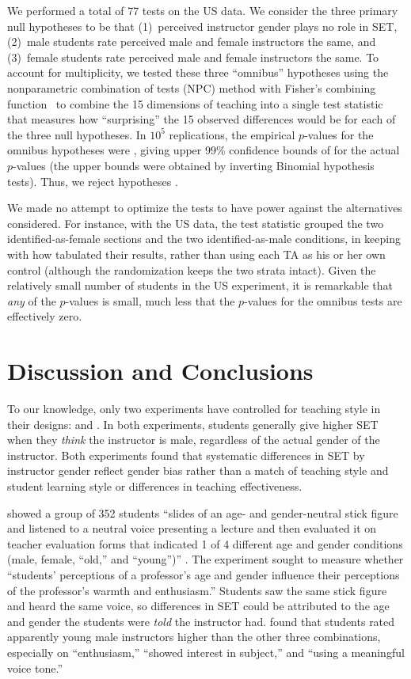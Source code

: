 \documentclass[12pt]{article}
\newcommand{\todo}[1]{{\color{red}{TO DO: \sc #1}}}
\begin{document}
We performed a total of 77 tests on the US data.
We consider the three primary null hypotheses to be that 
(1)~perceived instructor gender plays no role in SET,
(2)~male students rate perceived male and female instructors the same, and
(3)~female students rate perceived male and female instructors the same.
To account for multiplicity, we tested these three ``omnibus'' hypotheses 
using the nonparametric combination of tests (NPC) method with Fisher's combining 
function~\citep[Chapter 4]{pesarinSalmaso10} to combine the 15 dimensions of teaching into
a single test statistic that measures how ``surprising'' the 15 observed differences would be
for each of the three null hypotheses.
In $10^5$ replications, the empirical $p$-values for the omnibus hypotheses were \todo{???},
giving upper 99\% confidence bounds of \todo{????} for the actual $p$-values (the upper bounds
were obtained by inverting Binomial hypothesis tests).
Thus, we reject hypotheses \todo{which?}.

We made no attempt to optimize the tests to have power 
against the alternatives considered.
For instance, with the US data, the test statistic
grouped the two identified-as-female sections and the two identified-as-male conditions,
in keeping with how \citet{MacNell2014} tabulated their results,
rather than using each TA as his or her own control (although the randomization keeps the 
two strata intact). 
Given the relatively small number of students in the US experiment, it is remarkable that
\emph{any} of the $p$-values is small, much less that the $p$-values for the omnibus
tests are effectively zero.

\section{Discussion and Conclusions}
To our knowledge, only two experiments have controlled for teaching style in
their designs: \citet{Arbuckle2003} and \citet{MacNell2014}. 
In both experiments, students generally give higher SET when they \emph{think} the instructor
is male, regardless of the actual gender of the instructor.
Both experiments found that systematic differences in SET by instructor gender reflect gender bias 
rather than a match of teaching style and student learning style or differences
in teaching effectiveness. 

\citet{Arbuckle2003} showed a group of 352 students 
``slides of an age- and gender-neutral stick figure and listened to a neutral voice 
presenting a lecture and then evaluated it on teacher evaluation forms that indicated 
1 of 4 different age and gender conditions 
(male, female, ``old,'' and ``young'')'' \citealp[p.507]{Arbuckle2003}. 
The experiment sought to measure whether 
``students' perceptions of a professor's age and gender influence their perceptions of the 
professor's warmth and enthusiasm.'' 
Students saw the same stick figure and heard the same voice, so differences in SET 
could be attributed to the age and gender the students were \emph{told} the instructor had.
\citet{Arbuckle2003} found that students rated apparently young male instructors higher 
than the other three combinations, especially on ``enthusiasm,'' ``showed interest in subject,'' 
and ``using a meaningful voice tone.'' 
\end{document}
